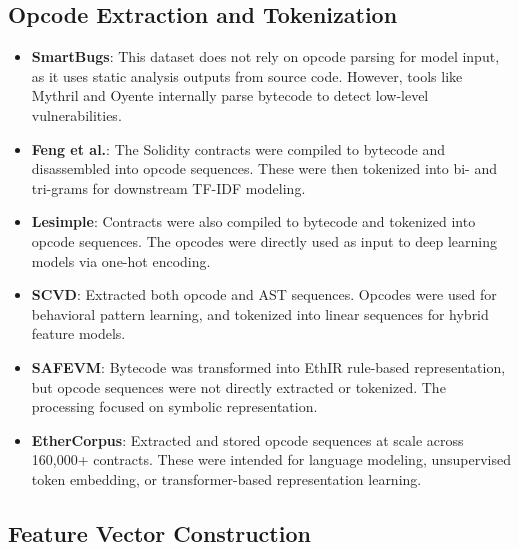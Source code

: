 \subsection*{Opcode Extraction and Tokenization}

\begin{itemize}
    \item \textbf{SmartBugs}: This dataset does not rely on opcode parsing for model input, as it uses static analysis outputs from source code. However, tools like Mythril and Oyente internally parse bytecode to detect low-level vulnerabilities.
    \item \textbf{Feng et al.}: The Solidity contracts were compiled to bytecode and disassembled into opcode sequences. These were then tokenized into bi- and tri-grams for downstream TF-IDF modeling.
    \item \textbf{Lesimple}: Contracts were also compiled to bytecode and tokenized into opcode sequences. The opcodes were directly used as input to deep learning models via one-hot encoding.
    \item \textbf{SCVD}: Extracted both opcode and AST sequences. Opcodes were used for behavioral pattern learning, and tokenized into linear sequences for hybrid feature models.
    \item \textbf{SAFEVM}: Bytecode was transformed into EthIR rule-based representation, but opcode sequences were not directly extracted or tokenized. The processing focused on symbolic representation.
    \item \textbf{EtherCorpus}: Extracted and stored opcode sequences at scale across 160,000+ contracts. These were intended for language modeling, unsupervised token embedding, or transformer-based representation learning.
\end{itemize}

\subsection*{Feature Vector Construction}

